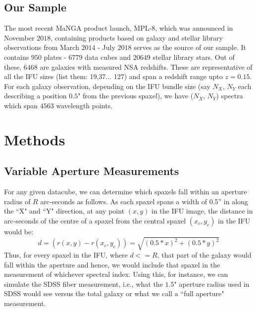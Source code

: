 \subsection{Our Sample}
The most recent MaNGA product launch, MPL-$8$, which was announced in November $2018$, containing products based on galaxy and stellar library observations from March $2014$ - July $2018$ serves as the source of our sample. It contains $950$ plates - $6779$ data cubes and $20649$ stellar library stars. Out of these, $6468$ are galaxies with measured NSA redshifts. These are representative of all the IFU sizes (list them: 19,37... 127) and span a redshift range upto $z = 0.15$.\\
For each galaxy observation, depending on the IFU bundle size (say $N_{X}$, $N_{Y}$ each describing a position $0.5$" from the previous spaxel), we have ($N_{X}$, $N_{Y}$) spectra which span $4563$ wavelength points. 

\section{Methods}
\label{sec:chap2methods}

\subsection{Variable Aperture Measurements}
For any given datacube, we can determine which spaxels fall within an aperture radius of $R$ arc-seconds as follows. As each spaxel spans a width of 0.5'' in along the ``X" and ``Y" direction, at any point $(x,y)$ in the IFU image, the distance in arc-seconds of the centre of a spaxel from the central spaxel $(x_{c},y_{c})$ in the IFU would be:
$$ d = (r(x,y) - r(x_{c},y_{c})) = \sqrt{(0.5*x)^2 + (0.5*y)^2} $$
Thus, for every spaxel in the IFU, where $d<=R$, that part of the galaxy would fall within the aperture and hence, we would include that spaxel in the measurement of whichever spectral index. Using this, for instance, we can simulate the SDSS fiber measurement, i.e.,  what the $1.5$" aperture radius used in SDSS would see versus the total galaxy or what we call a ``full aperture" measurement.


